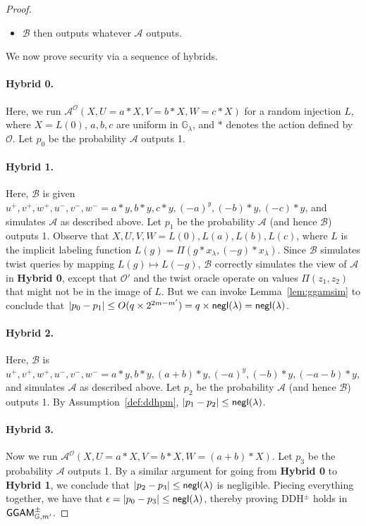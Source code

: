 \documentclass{article}\usepackage[a4paper,margin=20mm]{geometry}
\numberwithin{theorem}{section}
\numberwithin{equation}{section}
\newcommand{\G}{\mathbb{G}}
\newcommand{\As}{{\mathcal{A}}}
\newcommand{\Bs}{{\mathcal{B}}}
\newcommand{\Os}{{\mathcal{O}}}
\newcommand{\negl}{{\sf negl}}
\newcommand{\GGAM}{{\sf GGAM}}
\begin{document}
\begin{proof}
\begin{itemize}
		\item $\Bs$ then outputs whatever $\As$ outputs.
	\end{itemize}
	We now prove security via a sequence of hybrids.
	\paragraph{Hybrid 0.} Here, we run $\As^{\Os}(X,U=a*X,V=b*X,W=c*X)$ for a random injection $L$, where $X=L(0)$, $a,b,c$ are uniform in $\G_\lambda$, and $*$ denotes the action defined by $\Os$. Let $p_0$ be the probability $\As$ outputs 1.
	\paragraph{Hybrid 1.} Here, $\Bs$ is given $u^+,v^+,w^+,u^-,v^-,w^-=a*y,b*y,c*y,(-a)^y,(-b)*y,(-c)*y$, and simulates $\As$ as described above. Let $p_1$ be the probability $\As$ (and hence $\Bs$) outputs 1. Observe that $X,U,V,W=L(0),L(a),L(b),L(c)$, where $L$ is the implicit labeling function $L(g)=\Pi(g*x_\lambda,(-g)*x_\lambda)$. Since $\Bs$ simulates twist queries by mapping $L(g)\mapsto L(-g)$, $\Bs$ correctly simulates the view of $\As$ in {\bf Hybrid 0}, except that $\Os'$ and the twist oracle operate on values $\Pi(z_1,z_2)$ that might not be in the image of $L$. But we can invoke Lemma~\ref{lem:ggamsim} to conclude that $|p_0-p_1|\leq O(q\times 2^{2m-m'})=q\times\negl(\lambda)=\negl(\lambda)$.
	\paragraph{Hybrid 2.} Here, $\Bs$ is $u^+,v^+,w^+,u^-,v^-,w^-=a*y,b*y,(a+b)*y,(-a)^y,(-b)*y,(-a-b)*y$, and simulates $\As$ as described above. Let $p_2$ be the probability $\As$ (and hence $\Bs$) outputs 1. By Assumption~\ref{def:ddhpm}, $|p_1-p_2|\leq\negl(\lambda)$.
	\paragraph{Hybrid 3.} Now we run $\As^{\Os}(X,U=a*X,V=b*X,W=(a+b)*X)$. Let $p_3$ be the probability $\As$ outputs 1. By a similar argument for going from {\bf Hybrid 0} to {\bf Hybrid 1}, we conclude that $|p_2-p_3|\leq\negl(\lambda)$ is negligible. Piecing everything together, we have that $\epsilon=|p_0-p_3|\leq\negl(\lambda)$, thereby proving DDH$^\pm$ holds in $\GGAM^\pm_{\G,m'}$.\end{proof}
\end{document}
